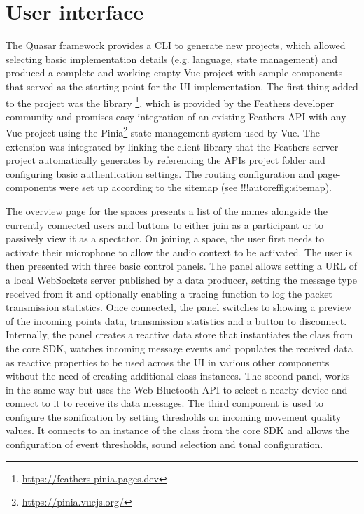 \section{User interface}

The Quasar framework provides a \ac{CLI} to generate new projects, which allowed selecting basic implementation details (e.g. language, state management) and produced a complete and working empty Vue project with sample components that served as the starting point for the \ac{UI} implementation.
The first thing added to the project was the library \footnote{\url{https://feathers-pinia.pages.dev}}, which is provided by the Feathers developer community and promises easy integration of an existing Feathers \ac{API} with any Vue project using the Pinia\footnote{\url{https://pinia.vuejs.org/}} state management system used by Vue.
The extension was integrated by linking the client library that the Feathers server project automatically generates by referencing the \ac{API}\textquotesingle s project folder and configuring basic authentication settings.
The routing configuration and page-components were set up according to the sitemap (see !!!autoref{fig:sitemap}).

The overview page for the spaces presents a list of the names alongside the currently connected users and buttons to either join as a participant or to passively view it as a spectator.
On joining a space, the user first needs to activate their microphone to allow the audio context to be activated.
The user is then presented with three basic control panels.
The  panel allows setting a URL of a local WebSockets server published by a data producer, setting the message type received from it and optionally enabling a tracing function to log the packet transmission statistics.
Once connected, the panel switches to showing a preview of the incoming points data, transmission statistics and a button to disconnect.
Internally, the panel creates a reactive data store that instantiates the  class from the core \ac{SDK}, watches incoming message events and populates the received data as reactive properties to be used across the \ac{UI} in various other components without the need of creating additional class instances.
The second panel,  works in the same way but uses the Web Bluetooth \ac{API} to select a nearby device and connect to it to receive its data messages.
The third component is used to configure the sonification by setting thresholds on incoming movement quality values.
It connects to an instance of the  class from the core \ac{SDK} and allows the configuration of event thresholds, sound selection and tonal configuration.

